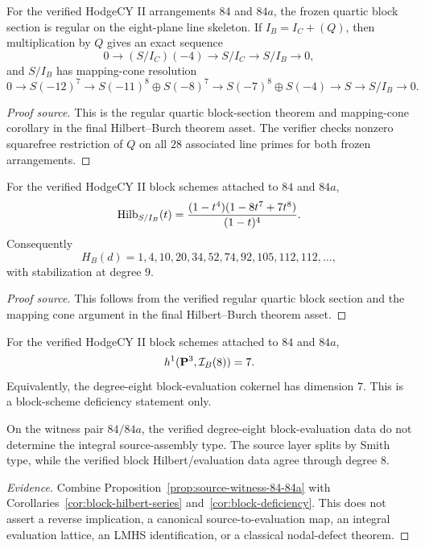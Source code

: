 \begin{proposition}\label{prop:quartic-block-section}
For the verified HodgeCY II arrangements \(84\) and \(84a\), the frozen quartic
block section is regular on the eight-plane line skeleton.  If \(I_B=I_C+(Q)\),
then multiplication by \(Q\) gives an exact sequence
\[
0\longrightarrow (S/I_C)(-4)\longrightarrow S/I_C
\longrightarrow S/I_B\longrightarrow 0,
\]
and \(S/I_B\) has mapping-cone resolution
\[
0
\longrightarrow S(-12)^7
\longrightarrow S(-11)^8 \oplus S(-8)^7
\longrightarrow S(-7)^8 \oplus S(-4)
\longrightarrow S
\longrightarrow S/I_B
\longrightarrow 0 .
\]
\end{proposition}

\begin{proof}[Proof source]
This is the regular quartic block-section theorem and mapping-cone corollary
in the final Hilbert--Burch theorem asset.  The verifier checks nonzero
squarefree restriction of \(Q\) on all \(28\) associated line primes for both
frozen arrangements.
\end{proof}

\begin{corollary}\label{cor:block-hilbert-series}
For the verified HodgeCY II block schemes attached to \(84\) and \(84a\),
\[
  {\rm Hilb}_{S/I_B}(t)=
  \frac{(1-t^4)(1-8t^7+7t^8)}{(1-t)^4}.
\]
Consequently
\[
H_B(d)=1,4,10,20,34,52,74,92,105,112,112,\ldots,
\]
with stabilization at degree \(9\).
\end{corollary}

\begin{proof}[Proof source]
This follows from the verified regular quartic block section and the mapping
cone argument in the final Hilbert--Burch theorem asset.
\end{proof}

\begin{corollary}\label{cor:block-deficiency}
For the verified HodgeCY II block schemes attached to \(84\) and \(84a\),
\[
  h^1({\bf P}^3,\mathcal I_B(8))=7.
\]
Equivalently, the degree-eight block-evaluation cokernel has dimension \(7\).
This is a block-scheme deficiency statement only.
\end{corollary}

\begin{proposition}\label{prop:source-block-nondetermination}
On the witness pair \(84/84a\), the verified degree-eight block-evaluation data
do not determine the integral source-assembly type.  The source layer splits by
Smith type, while the verified block Hilbert/evaluation data agree through
degree \(8\).
\end{proposition}

\begin{proof}[Evidence]
Combine Proposition~\ref{prop:source-witness-84-84a} with
Corollaries~\ref{cor:block-hilbert-series} and~\ref{cor:block-deficiency}.
This does not assert a reverse implication, a canonical source-to-evaluation
map, an integral evaluation lattice, an LMHS identification, or a classical
nodal-defect theorem.
\end{proof}

